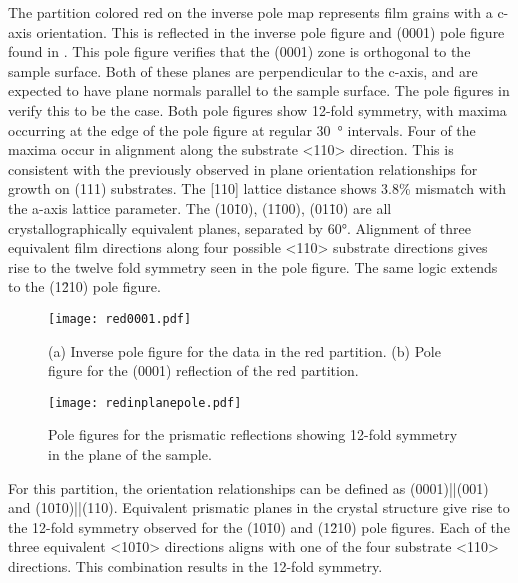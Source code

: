 The partition colored red on the inverse pole map represents film grains with a c-axis
orientation. This is reflected in the inverse pole figure and (0001) pole figure found in
. This pole figure verifies that the (0001) zone is orthogonal to the
sample surface. 
Both of these planes are perpendicular to the c-axis, and are expected to have plane
normals parallel to the sample surface. The pole figures in 
verify this to be the case. Both pole figures show 12-fold symmetry, with maxima occurring
at the edge of the pole figure at regular \SI{30}{\degree} intervals. Four of the maxima
occur in alignment along the substrate <110> direction. This is consistent with the
previously observed in plane orientation relationships for growth on (111)
substrates. The  [110] lattice distance shows 3.8\% mismatch with the
 a-axis lattice parameter. The (10\={1}0), (1\={1}00),  (01\={1}0) are all
crystallographically equivalent planes, separated by 60\si{\degree}. Alignment of three
equivalent film directions along four possible <110> substrate directions gives rise to
the twelve fold symmetry seen in the pole figure. The same logic extends to the (1\={2}10)
pole figure.
\begin{figure}
	\centering
	\texttt{[image: red0001.pdf]}
	\caption[Orientation analysis for red partition]{%
		(a) Inverse pole figure for the data in the red partition. (b) Pole 
		figure for the (0001) reflection of the red partition.}
	\label{fig:red0001}
\end{figure}
\begin{figure}
	\centering
	\texttt{[image: redinplanepole.pdf]}
	\caption[Pole figures for prismatic reflections]{%
		Pole figures for the prismatic reflections showing 12-fold 
		symmetry in the plane of the sample.}
	\label{fig:redinplanepole}
\end{figure}
For this partition, the orientation relationships can be defined as
(0001)||(001) and (10\={1}0)||(110). Equivalent
prismatic planes in the  crystal structure give rise to the 12-fold symmetry
observed for the (10\={1}0) and (1\={2}10) pole figures. Each of the three equivalent
<10\={1}0> directions aligns with one of the four substrate <110> directions. This
combination results in the 12-fold symmetry.


